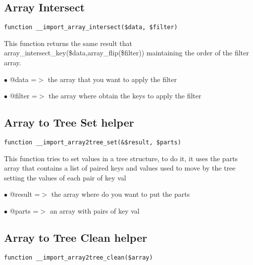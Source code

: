 \documentclass[a4paper]{book}
\begin{document}
\hypertarget{toc173}{}
\subsection{Array Intersect}

\begin{lstlisting}
function __import_array_intersect($data, $filter)
\end{lstlisting}

This function returns the same result that array\_intersect\_key(\$data,array\_flip(\$filter))
maintaining the order of the filter array.

\begin{compactitem}
\item[\color{myblue}$\bullet$] @data   =$>$ the array that you want to apply the filter
\item[\color{myblue}$\bullet$] @filter =$>$ the array where obtain the keys to apply the filter
\end{compactitem}

\hypertarget{toc174}{}
\subsection{Array to Tree Set helper}

\begin{lstlisting}
function __import_array2tree_set(&$result, $parts)
\end{lstlisting}

This function tries to set values in a tree structure, to do it, it uses
the parts array that contains a list of paired keys and values used to move
by the tree setting the values of each pair of key val

\begin{compactitem}
\item[\color{myblue}$\bullet$] @result =$>$ the array where do you want to put the parts
\item[\color{myblue}$\bullet$] @parts  =$>$ an array with pairs of key val
\end{compactitem}

\hypertarget{toc175}{}
\subsection{Array to Tree Clean helper}

\begin{lstlisting}
function __import_array2tree_clean($array)
\end{lstlisting}
\end{document}
